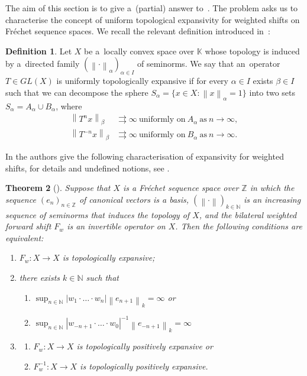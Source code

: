 \documentclass[11pt,a4paper]{amsart}
\newtheorem{theorem}{Theorem}[section]
\theoremstyle{definition}
\newtheorem{definition}[theorem]{Definition}
\newcommand{\Z}{\mathbb{Z}}
\newcommand{\N}{\mathbb{N}}
\newcommand{\K}{\mathbb{K}}
\newcommand{\uniTo}{\rightrightarrows}
\newcommand{\abs}[1]{\left| #1 \right|}
\newcommand{\norm}[1]{\left\| #1 \right\|}
\begin{document}
	The aim of this section is to give a~(partial) answer to~\cite[Problem~E]{Darji}. The problem asks us to characterise the concept of uniform topological expansivity for weighted shifts on Fr\'echet sequence spaces. We recall the relevant definition introduced in~\cite{Darji}:
	\begin{definition} \label{def:UTE}
		Let $X$ be a~locally convex space over $\K$ whose topology is induced by a~directed family $(\norm{\cdot}_\alpha)_{\alpha \in I}$ of seminorms. We say that an~operator $T \in GL(X)$ is uniformly topologically expansive if for every $\alpha \in I$ exists $\beta \in I$ such that we can decompose the sphere $S_\alpha = \{x \in X : \norm{x}_\alpha = 1\}$ into two sets $S_\alpha = A_\alpha \cup B_\alpha$, where
		\begin{align*}
			\norm{T^n x}_\beta &\uniTo \infty \ \text{uniformly on} \ A_\alpha \ \text{as} \ n \to \infty,\\
			\norm{T^{-n} x}_\beta &\uniTo \infty \ \text{uniformly on} \ B_\alpha \ \text{as} \ n \to \infty.
		\end{align*}
	\end{definition}
	In \cite{Darji} the authors give the following characterisation of expansivity for weighted shifts, for details and undefined notions, see \cite{Darji}.
	\begin{theorem}[{\cite[Theorem 42]{Darji}}]
		Suppose that \(X\) is a Fr\'echet sequence space over \(\Z\) in which the sequence \((e_n)_{n \in \Z}\) of canonical vectors is a basis, \((\norm{\cdot})_{k \in \N}\) is an increasing sequence of seminorms that induces the topology of \(X\), and the bilateral weighted forward shift \(F_w\) is an invertible operator on \(X\). Then the following conditions are equivalent: 
		\begin{enumerate}
			\item \(F_w : X \to X\) is topologically expansive;
			\item there exists \(k \in \N\) such that
			\begin{enumerate}
				\item \(\sup_{n \in \N}\abs{w_1 \cdot \dots \cdot w_n}\norm{e_{n+1}}_k = \infty\) or
				\item \(\sup_{n \in \N}\abs{w_{-n+1}\cdot \dots \cdot w_0}^{-1}\norm{e_{-n+1}}_k = \infty\)
			\end{enumerate}
			\item \begin{enumerate}
				\item \(F_w: X \to X\) is topologically positively expansive or
				\item \(F^{-1}_w : X \to X\) is topologically positively expansive.
			\end{enumerate}
		\end{enumerate}
	\end{theorem}
	
\end{document}

